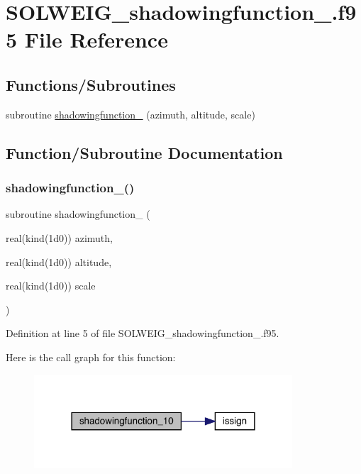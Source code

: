 \hypertarget{_s_o_l_w_e_i_g__shadowingfunction__10_8f95}{}\section{S\+O\+L\+W\+E\+I\+G\+\_\+shadowingfunction\+\_.\+f95 File Reference}
\label{_s_o_l_w_e_i_g__shadowingfunction__10_8f95}
\subsection*{Functions/\+Subroutines}
\begin{DoxyCompactItemize}
\item 
subroutine \hyperlink{_s_o_l_w_e_i_g__shadowingfunction__10_8f95_ae06b795b97e146140690c35b203db434}{shadowingfunction\+\_} (azimuth, altitude, scale)
\end{DoxyCompactItemize}


\subsection{Function/\+Subroutine Documentation}
\mbox{\label{_s_o_l_w_e_i_g__shadowingfunction__10_8f95_ae06b795b97e146140690c35b203db434}} 
\subsubsection{\texorpdfstring{shadowingfunction\+\_()}{shadowingfunction\_10()}}
{\footnotesize\ttfamily subroutine shadowingfunction\+\_ (\begin{DoxyParamCaption}\item[{real(kind(1d0))}]{azimuth,  }\item[{real(kind(1d0))}]{altitude,  }\item[{real(kind(1d0))}]{scale }\end{DoxyParamCaption})}



Definition at line 5 of file S\+O\+L\+W\+E\+I\+G\+\_\+shadowingfunction\+\_.\+f95.

Here is the call graph for this function\+:\nopagebreak
\begin{figure}[H]
\begin{center}
\leavevmode
\includegraphics[width=273pt]{_s_o_l_w_e_i_g__shadowingfunction__10_8f95_ae06b795b97e146140690c35b203db434_cgraph}
\end{center}
\end{figure}
